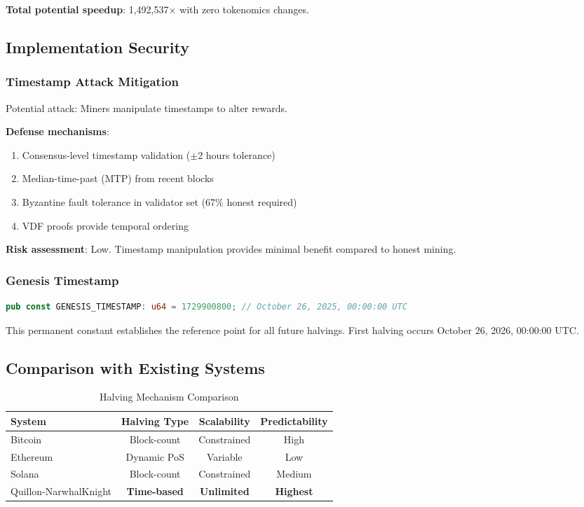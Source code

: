 \documentclass[11pt,a4paper]{article}
\begin{document}
\textbf{Total potential speedup}: 1,492,537$\times$ with zero tokenomics changes.

\subsection{Implementation Security}

\subsubsection{Timestamp Attack Mitigation}

Potential attack: Miners manipulate timestamps to alter rewards.

\textbf{Defense mechanisms}:
\begin{enumerate}
    \item Consensus-level timestamp validation ($\pm$2 hours tolerance)
    \item Median-time-past (MTP) from recent blocks
    \item Byzantine fault tolerance in validator set (67\% honest required)
    \item VDF proofs provide temporal ordering
\end{enumerate}

\textbf{Risk assessment}: Low. Timestamp manipulation provides minimal benefit compared to honest mining.

\subsubsection{Genesis Timestamp}

\begin{lstlisting}[language=Rust]
pub const GENESIS_TIMESTAMP: u64 = 1729900800; // October 26, 2025, 00:00:00 UTC
\end{lstlisting}

This permanent constant establishes the reference point for all future halvings. First halving occurs October 26, 2026, 00:00:00 UTC.

\subsection{Comparison with Existing Systems}

\begin{table}[H]
\centering
\caption{Halving Mechanism Comparison}
\begin{tabular}{|l|c|c|c|}
\hline
\textbf{System} & \textbf{Halving Type} & \textbf{Scalability} & \textbf{Predictability} \\
\hline
Bitcoin & Block-count & Constrained & High \\
Ethereum & Dynamic PoS & Variable & Low \\
Solana & Block-count & Constrained & Medium \\
Quillon-NarwhalKnight & \textbf{Time-based} & \textbf{Unlimited} & \textbf{Highest} \\
\hline
\end{tabular}
\label{tab:halving-comparison}
\end{table}
\end{document}

